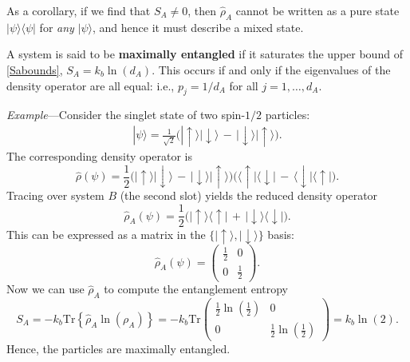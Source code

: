 \documentclass[pra,12pt]{revtex4-2}
\begin{document}
As a corollary, if we find that $S_{A} \ne 0$, then $\hat{\rho}_A$
cannot be written as a pure state $|\psi\rangle\langle\psi|$ for
\textit{any} $|\psi\rangle$, and hence it must describe a mixed state.

A system is said to be \textbf{maximally entangled} if it saturates
the upper bound of \eqref{Sabounds}, $S_A = k_b \ln(d_A)$.  This
occurs if and only if the eigenvalues of the density operator are all
equal: i.e., $p_j = 1/d_A$ for all $j = 1, \dots, d_A$.

\begin{framed}
\noindent
\textit{Example}---Consider the singlet state of two spin-$1/2$
particles:
\begin{align}
  |\psi\rangle = \frac{1}{\sqrt{2}} \Big(|\!\uparrow\rangle|\!\downarrow\rangle \,-\, |\!\downarrow\rangle|\!\uparrow\rangle\Big).
\end{align}
The corresponding density operator is
\begin{equation}
  \hat{\rho}(\psi) = \frac{1}{2} \Big(|\!\uparrow\rangle|\!\downarrow\rangle \,-\, |\!\downarrow\rangle|\!\uparrow\rangle\Big) \Big(\langle\uparrow\!|\langle\downarrow\!| \,-\, \langle\downarrow\!|\langle\uparrow\!|\Big).
\end{equation}
Tracing over system $B$ (the second slot) yields the reduced density operator
\begin{equation}
  \hat{\rho}_A(\psi) = \frac{1}{2} \Big(|\!\uparrow\rangle \langle\uparrow\!| \,+\, |\!\downarrow\rangle \langle\downarrow\!|\Big).
\end{equation}
This can be expressed as a matrix in the
$\{|\!\uparrow\rangle,|\!\downarrow\rangle\}$ basis:
\begin{equation}
  \hat{\rho}_A(\psi) = \begin{pmatrix}\frac{1}{2} & 0 \\ 0 & \frac{1}{2}\end{pmatrix}.
\end{equation}
Now we can use $\hat{\rho}_A$ to compute the entanglement entropy
\begin{equation}
  S_A = -k_b\mathrm{Tr}\left\{\hat{\rho}_A\ln(\rho_A)\right\} = -k_b\mathrm{Tr}\begin{pmatrix}\frac{1}{2}\ln\left(\frac{1}{2}\right) & 0 \\ 0 & \frac{1}{2}\ln\left(\frac{1}{2}\right)\end{pmatrix} = k_b\ln(2).
\end{equation}
Hence, the particles are maximally entangled.
\end{framed}
\end{document}
